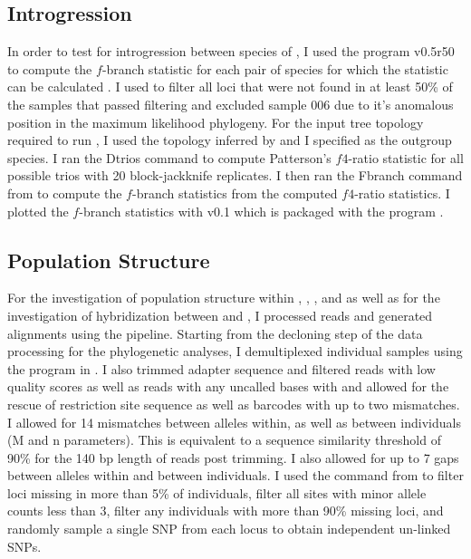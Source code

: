 \subsection{Introgression}
In order to test for introgression between species of \anaxyrus, I used the 
program \dsuite v0.5r50 \parencite{malinsky2021} to compute the $f$-branch 
statistic for each pair of \anaxyrus species for which the statistic 
can be calculated \parencite{reich2009,malinsky2018}. 
I used \pyrad to filter all loci that were not found in at least 50\% of the 
samples that passed filtering and excluded sample 006 due to it's anomalous 
position in the maximum likelihood phylogeny.
For the input tree topology required to run \dsuite, I used the topology inferred
by \phycoeval and I specified \nebulifer as the outgroup species.
I ran the \dsuite Dtrios command to compute Patterson's $f4$-ratio
statistic for all possible trios with 20 block-jackknife replicates.
I then ran the Fbranch command from \dsuite to compute the $f$-branch statistics 
from the computed $f4$-ratio statistics. 
I plotted the $f$-branch statistics with \dtools v0.1 which is packaged with
the \dsuite program \parencite{malinsky2021}. 

\subsection{Population Structure}
For the investigation of population structure within \amer, \fowl, \terr, and 
\wood as well as for the investigation of hybridization between \fowl and \wood,
I processed reads and generated alignments using the \stacks pipeline. 
Starting from the decloning step of the data processing for the phylogenetic 
analyses, I demultiplexed individual samples using the \processradtags program 
in \stacks. 
I also trimmed adapter sequence and filtered reads with low quality scores as 
well as reads with any uncalled bases with \processradtags and allowed for the rescue of 
restriction site sequence as well as barcodes with up to two mismatches.  
I allowed for 14 mismatches between alleles within, as well as between individuals
(M and n parameters). This is equivalent to a sequence similarity threshold of   
90\% for the 140 bp length of reads post trimming. 
I also allowed for up to 7 gaps between alleles within and between individuals.
I used the \populations command from \stacks to filter loci missing in more than   
5\% of individuals, filter all sites with minor allele counts less than 3, filter 
any individuals with more than 90\% missing loci, and randomly sample a single
SNP from each locus to obtain independent un-linked SNPs.

